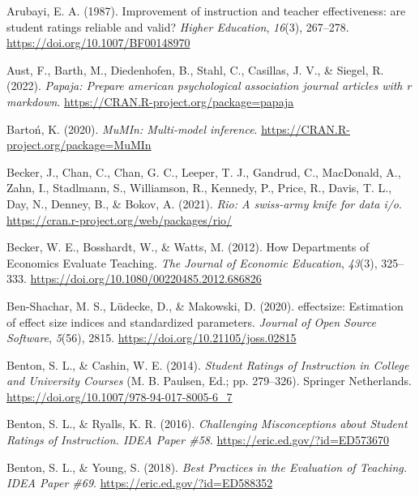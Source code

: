 \documentclass[
  man,mask]{apa7}
\newlength{\cslhangindent}
\newenvironment{CSLReferences}[2] %
 {\begin{list}{}{%
  \setlength{\itemindent}{0pt}
  \setlength{\leftmargin}{0pt}
  \setlength{\parsep}{0pt}
  \ifodd #1
   \setlength{\leftmargin}{\cslhangindent}
   \setlength{\itemindent}{-1\cslhangindent}
  \fi
  \setlength{\itemsep}{#2\baselineskip}}}
 {\end{list}}
\begin{document}
\label{refs}
\begin{CSLReferences}{1}{0}
Arubayi, E. A. (1987). Improvement of instruction and teacher effectiveness: are student ratings reliable and valid? \emph{Higher Education}, \emph{16}(3), 267--278. \url{https://doi.org/10.1007/BF00148970}

Aust, F., Barth, M., Diedenhofen, B., Stahl, C., Casillas, J. V., \& Siegel, R. (2022). \emph{Papaja: Prepare american psychological association journal articles with r markdown}. \url{https://CRAN.R-project.org/package=papaja}

Bartoń, K. (2020). \emph{MuMIn: Multi-model inference}. \url{https://CRAN.R-project.org/package=MuMIn}

Becker, J., Chan, C., Chan, G. C., Leeper, T. J., Gandrud, C., MacDonald, A., Zahn, I., Stadlmann, S., Williamson, R., Kennedy, P., Price, R., Davis, T. L., Day, N., Denney, B., \& Bokov, A. (2021). \emph{Rio: A swiss-army knife for data i/o}. \url{https://cran.r-project.org/web/packages/rio/}

Becker, W. E., Bosshardt, W., \& Watts, M. (2012). How Departments of Economics Evaluate Teaching. \emph{The Journal of Economic Education}, \emph{43}(3), 325--333. \url{https://doi.org/10.1080/00220485.2012.686826}

Ben-Shachar, M. S., Lüdecke, D., \& Makowski, D. (2020). {e}ffectsize: Estimation of effect size indices and standardized parameters. \emph{Journal of Open Source Software}, \emph{5}(56), 2815. \url{https://doi.org/10.21105/joss.02815}

Benton, S. L., \& Cashin, W. E. (2014). \emph{Student Ratings of Instruction in College and University Courses} (M. B. Paulsen, Ed.; pp. 279--326). Springer Netherlands. \url{https://doi.org/10.1007/978-94-017-8005-6_7}

Benton, S. L., \& Ryalls, K. R. (2016). \emph{Challenging Misconceptions about Student Ratings of Instruction. IDEA Paper {\#}58}. \url{https://eric.ed.gov/?id=ED573670}

Benton, S. L., \& Young, S. (2018). \emph{Best Practices in the Evaluation of Teaching. IDEA Paper {\#}69}. \url{https://eric.ed.gov/?id=ED588352}


\end{CSLReferences}
\end{document}

